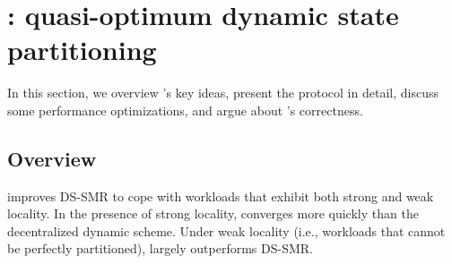 \section{\dynastar: quasi-optimum dynamic state partitioning}


In this section, we overview \dynastar's key ideas, present the protocol in detail, discuss some performance optimizations, and argue about \dynastar's correctness.

\subsection{Overview}

\dynastar improves DS-SMR to cope with workloads that exhibit both strong and weak locality.
In the presence of strong locality, \dynastar converges more quickly than the decentralized dynamic scheme.
Under weak locality (i.e., workloads that cannot be perfectly partitioned), \dynastar largely outperforms DS-SMR.

